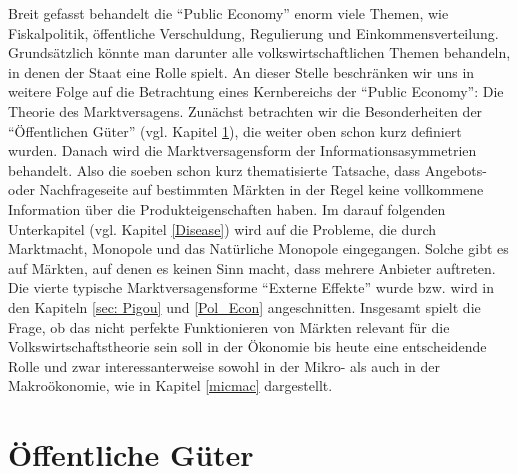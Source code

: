 Breit gefasst behandelt die "`Public Economy"' enorm viele Themen, wie Fiskalpolitik, öffentliche Verschuldung, Regulierung und Einkommensverteilung. Grundsätzlich könnte man darunter alle volkswirtschaftlichen Themen behandeln, in denen der Staat eine Rolle spielt. An dieser Stelle beschränken wir uns in weitere Folge auf die Betrachtung eines Kernbereichs der "`Public Economy"': Die Theorie des Marktversagens. Zunächst betrachten wir die Besonderheiten der "`Öffentlichen Güter"' (vgl. Kapitel \ref{Offentliche Guter}), die weiter oben schon kurz definiert wurden. Danach wird die Marktversagensform der Informationsasymmetrien behandelt. Also die soeben schon kurz thematisierte Tatsache, dass Angebots- oder Nachfrageseite auf bestimmten Märkten in der Regel keine vollkommene Information über die Produkteigenschaften haben. Im darauf folgenden Unterkapitel (vgl. Kapitel \ref{Disease}) wird auf die Probleme, die durch Marktmacht, Monopole und das Natürliche Monopole eingegangen. Solche gibt es auf Märkten, auf denen es keinen Sinn macht, dass mehrere Anbieter auftreten. Die vierte typische Marktversagensforme "`Externe Effekte"' wurde bzw. wird in den Kapiteln \ref{sec: Pigou} und \ref{Pol_Econ} angeschnitten. Insgesamt spielt die Frage, ob das nicht perfekte Funktionieren von Märkten relevant für die Volkswirtschaftstheorie sein soll in der Ökonomie bis heute eine entscheidende Rolle und zwar interessanterweise sowohl in der Mikro- als auch in der Makroökonomie, wie in Kapitel \ref{micmac} dargestellt.


\section{Öffentliche Güter}
\label{Offentliche Guter}


